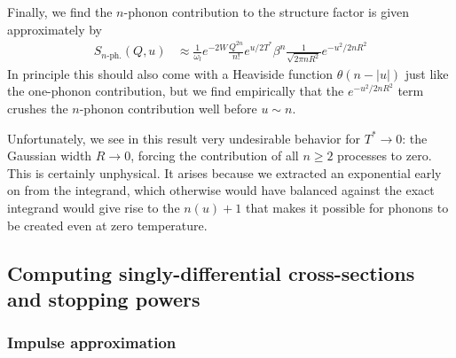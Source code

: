 \documentclass{article}
\begin{document}
Finally, we find the $n$-phonon contribution to the structure factor is given approximately by
\begin{align}
S_{n\text{-ph.}}(Q, u) &\approx \frac{1}{\omega_l} e^{-2 W} \frac{Q^{2 n}}{n!} e^{u/2T^*} \beta^n \frac{1}{\sqrt{2 \pi n R^2}} e^{-u^2 / 2 nR^2}
\label{eq:MultiPhononContribution}
\end{align}
In principle this should also come with a Heaviside function $\theta(n - |u|)$ just like the one-phonon contribution, but we find empirically that the $e^{-u^2 / 2 nR^2}$ term crushes the $n$-phonon contribution well before $u \sim n$.

Unfortunately, we see in this result very undesirable behavior for $T^*\to 0$: the Gaussian width $R\to 0$, forcing the contribution of all $n\geq 2$ processes to zero. This is certainly unphysical. It arises because we extracted an exponential early on from the integrand, which otherwise would have balanced against the exact integrand would give rise to the $n(u) + 1$ that makes it possible for phonons to be created even at zero temperature.

%


\subsection{Computing singly-differential cross-sections and stopping powers}

\subsubsection{Impulse approximation}
\end{document}
